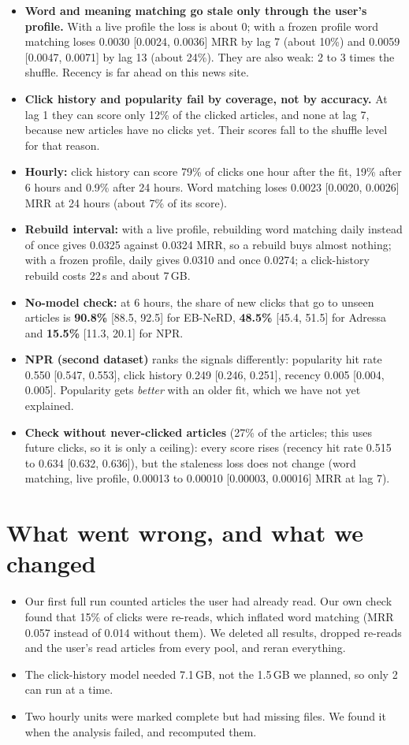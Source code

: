 \documentclass[10pt,a4paper]{article}
\begin{document}
\begin{itemize}
\item \textbf{Word and meaning matching go stale only through the user's profile.} With a live profile the loss is about 0; with a frozen profile word matching loses 0.0030 [0.0024, 0.0036] MRR by lag 7 (about 10\%) and 0.0059 [0.0047, 0.0071] by lag 13 (about 24\%). They are also weak: 2 to 3 times the shuffle. Recency is far ahead on this news site.
\item \textbf{Click history and popularity fail by coverage, not by accuracy.} At lag 1 they can score only 12\% of the clicked articles, and none at lag 7, because new articles have no clicks yet. Their scores fall to the shuffle level for that reason.
\item \textbf{Hourly:} click history can score 79\% of clicks one hour after the fit, 19\% after 6 hours and 0.9\% after 24 hours. Word matching loses 0.0023 [0.0020, 0.0026] MRR at 24 hours (about 7\% of its score).
\item \textbf{Rebuild interval:} with a live profile, rebuilding word matching daily instead of once gives 0.0325 against 0.0324 MRR, so a rebuild buys almost nothing; with a frozen profile, daily gives 0.0310 and once 0.0274; a click-history rebuild costs 22\,s and about 7\,GB.
\item \textbf{No-model check:} at 6 hours, the share of new clicks that go to unseen articles is \textbf{90.8\%} [88.5, 92.5] for EB-NeRD, \textbf{48.5\%} [45.4, 51.5] for Adressa and \textbf{15.5\%} [11.3, 20.1] for NPR.
\item \textbf{NPR (second dataset)} ranks the signals differently: popularity hit rate 0.550 [0.547, 0.553], click history 0.249 [0.246, 0.251], recency 0.005 [0.004, 0.005]. Popularity gets \emph{better} with an older fit, which we have not yet explained.
\item \textbf{Check without never-clicked articles} (27\% of the articles; this uses future clicks, so it is only a ceiling): every score rises (recency hit rate 0.515 to 0.634 [0.632, 0.636]), but the staleness loss does not change (word matching, live profile, 0.00013 to 0.00010 [0.00003, 0.00016] MRR at lag 7).
\end{itemize}

\section{What went wrong, and what we changed}
\begin{itemize}
\item Our first full run counted articles the user had already read. Our own check found that 15\% of clicks were re-reads, which inflated word matching (MRR 0.057 instead of 0.014 without them). We deleted all results, dropped re-reads and the user's read articles from every pool, and reran everything.
\item The click-history model needed 7.1\,GB, not the 1.5\,GB we planned, so only 2 can run at a time.
\item Two hourly units were marked complete but had missing files. We found it when the analysis failed, and recomputed them.
\end{itemize}
\end{document}
